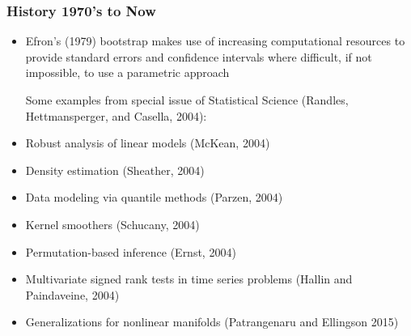 \documentclass[10pt]{beamer}
\begin{document}
\begin{frame}
\frametitle{History 1970's to Now}

\begin{itemize}
\item Efron's (1979) bootstrap makes use of increasing computational resources to provide standard errors and confidence intervals where  difficult, if not impossible, to use a parametric approach \newline

Some examples from special issue of Statistical Science (Randles, Hettmansperger, and Casella, 2004):
\item Robust analysis of linear models (McKean, 2004)
\item Density estimation (Sheather, 2004)
\item Data modeling via quantile methods (Parzen, 2004)
\item Kernel smoothers (Schucany, 2004)
\item Permutation-based inference (Ernst, 2004) 
\item Multivariate signed rank tests in time series problems (Hallin and Paindaveine, 2004)
\item Generalizations for nonlinear manifolds (Patrangenaru and Ellingson 2015)
\end{itemize}

\end{frame}
\end{document}
